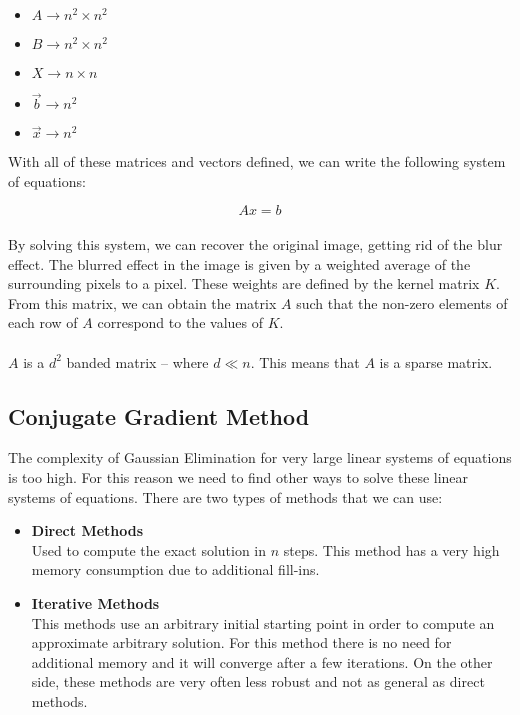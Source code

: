 \documentclass{article}
\begin{document}
\begin{itemize}
	\item $A \rightarrow n^2 \times n^2$
	\item $B \rightarrow n^2 \times n^2$
	\item $X \rightarrow n \times n$
	\item $\overrightarrow{b} \rightarrow n^2$
	\item $\overrightarrow{x} \rightarrow n^2$
\end{itemize}
With all of these matrices and vectors defined, we can write the following system of equations:

\[ Ax = b \] \\
By solving this system, we can recover the original image, getting rid of the blur effect. The blurred effect in the image is given by a weighted average of the surrounding pixels to a pixel. These weights are defined by the kernel matrix $K$. From this matrix, we can obtain the matrix $A$ such that the non-zero elements of each row of $A$ correspond to the values of $K$. \\ \\
$A$ is a $d^2$ banded matrix -- where $d \ll n$. This means that $A$ is a sparse matrix.

\subsection{Conjugate Gradient Method}
The complexity of Gaussian Elimination for very large linear systems of equations is too high. For this reason we need to find other ways to solve these linear systems of equations. There are two types of methods that we can use:

\begin{itemize}
	\item \textbf{Direct Methods}
	\vspace{.2cm} \\
	Used to compute the exact solution in $n$ steps. This method has a very high memory consumption due to additional fill-ins.
	
	\item \textbf{Iterative Methods}
	\vspace{.2cm} \\
	This methods use an arbitrary initial starting point in order to compute an approximate arbitrary solution. For this method there is no need for additional memory and it will converge after a few iterations. On the other side, these methods are very often less robust and not as general as direct methods.
\end{itemize}
\end{document}
